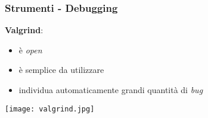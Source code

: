 \begin{frame}
\frametitle{Strumenti - Debugging}
	\par
  	\textbf{Valgrind}:
          \begin{itemize}
             \item è \textit{open}
             \item è semplice da utilizzare
             \item individua automaticamente grandi quantità di \textit{bug}
          \end{itemize}
	\begin{center}
		\texttt{[image: valgrind.jpg]}	
	\end{center}
\end{frame}


